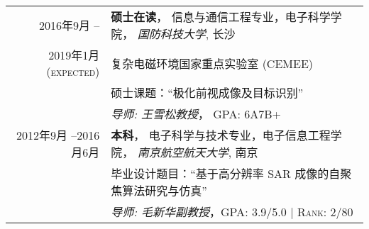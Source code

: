 %
%



\begin{tabular}{rl}	
	\textsc{2016年9月 --}			  & \textbf{硕士在读}， 信息与通信工程专业，电子科学学院， \emph{国防科技大学}, 长沙\\
	\textsc{2019年1月(expected)}	  &  复杂电磁环境国家重点实验室 (CEMEE) \\
									& 硕士课题：``极化前视成像及目标识别''\\
									&  \emph{导师: {王雪松教授}}， \textsc{GPA}: 6A7B+\\
	\textsc{2012年9月 --2016月6月} 	&  \textbf{本科}， 电子科学与技术专业，电子信息工程学院， \emph{南京航空航天大学}, 南京\\
									&  毕业设计题目：``基于高分辨率 SAR 成像的自聚焦算法研究与仿真''\\
									& \emph{导师:{ 毛新华副教授}}，\textsc{GPA}: 3.9/5.0 | \textsc{Rank}: 2/80 \\		
\end{tabular}
